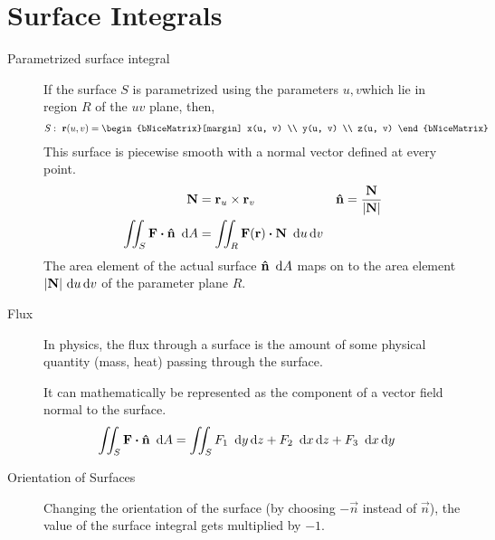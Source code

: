 \section{Surface Integrals}

\begin{description}
    \item[Parametrized surface integral] If the surface $ S $ is parametrized using
        the parameters $ u, v $which lie in region $ R $ of the $ uv $ plane, then,
        \begin{align}
            S :\ \vec{r}(u, v) & = \begin{bNiceMatrix}[margin]
                                       x(u, v) \\ y(u, v) \\ z(u, v)
                                   \end{bNiceMatrix}
        \end{align}
        This surface is piecewise smooth with a normal vector defined at every point.
        \begin{align}
            \vec{N}       & = \vec{r}_u \times \vec{r}_v                          &
            \vec{\hat{n}} & = \frac{\vec{N}}{\abs{\vec{N}}}                         \\
            \iint_S \vec{F} \dotp \vec{\hat{n}}
            \ \dl A       & = \iint_R \vec{F}(\vec{r}) \dotp \vec{N}\ \dl u \dl v
        \end{align}
        The area element of the actual surface $ \vec{\hat{n}}\ \dl A $ maps on to the
        area element $ \abs{\vec{N}} \dl u \dl v $ of the parameter plane $ R $.

    \item[Flux] In physics, the flux through a surface is the amount of some physical
        quantity (mass, heat) passing through the surface. \par
        It can mathematically be represented as the component of a vector field normal
        to the surface.
        \begin{align}
            \iint_S \vec{F} \dotp \vec{\hat{n}}\ \dl A &
            = \iint_S F_1\ \dl y \dl z + F_2\ \dl x \dl z + F_3\ \dl x \dl y
        \end{align}

    \item[Orientation of Surfaces] Changing the orientation of the surface (by choosing
        $ -\vec{n}$ instead of $ \vec{n} $), the value of the surface integral gets
        multiplied by $ -1 $.


\end{description}
